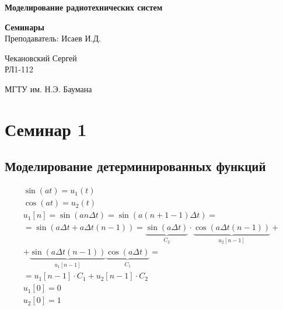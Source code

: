 \documentclass[14pt,a4paper,oneside]{extarticle}
\begin{document}


\begin{titlepage}
    \begin{center}
        \vspace*{1cm}

        \Huge
        \textbf{Моделирование радиотехнических систем}



        \vspace{1.5cm}

        \vfill
        \Huge
        \textbf{Семинары}\\
        \vspace{0.5cm}
        \LARGE
        Преподаватель: Исаев И.Д.
        \vfill

        \LARGE
        Чекановский Сергей\\
        РЛ1-112

        \vspace{0.8cm}


        \Large
        МГТУ им. Н.Э. Баумана

    \end{center}
\end{titlepage}

\tableofcontents

\clearpage

\section{Семинар 1}

\subsection{Моделирование детерминированных функций}

\begin{gather*}
    \sin(at)=u_1(t)\\
    \cos(at)=u_2(t)\\
    u_1[n]=\sin(an\Delta t)=\sin(a(n+1-1)\Delta t)=\\=\sin(a\Delta t +a\Delta t(n-1))=\underbrace{\sin(a\Delta t)}_{C_2}\cdot\underbrace{\cos(a\Delta t(n-1))}_{u_2[n-1]}+\\+\underbrace{\sin(a\Delta t(n-1))}_{u_1[n-1]}\underbrace{\cos(a\Delta t)}_{C_1}=\\=u_1[n-1]\cdot C_1+u_2[n-1]\cdot C_2 \\ u_1[0]=0\\ u_2[0]=1
\end{gather*}
\end{document}
